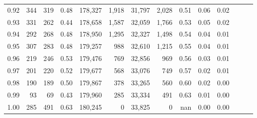 \begin{tabular}{rrrrrrrrrrrrrr}
0.92 &    344 &  319 &  0.48 &  178,327 &    1,918 &  31,797 &   2,028 &  0.51 &  0.06 &      0.02 \\
0.93 &    331 &  262 &  0.44 &  178,658 &    1,587 &  32,059 &   1,766 &  0.53 &  0.05 &      0.02 \\
0.94 &    292 &  268 &  0.48 &  178,950 &    1,295 &  32,327 &   1,498 &  0.54 &  0.04 &      0.01 \\
0.95 &    307 &  283 &  0.48 &  179,257 &      988 &  32,610 &   1,215 &  0.55 &  0.04 &      0.01 \\
0.96 &    219 &  246 &  0.53 &  179,476 &      769 &  32,856 &     969 &  0.56 &  0.03 &      0.01 \\
0.97 &    201 &  220 &  0.52 &  179,677 &      568 &  33,076 &     749 &  0.57 &  0.02 &      0.01 \\
0.98 &    190 &  189 &  0.50 &  179,867 &      378 &  33,265 &     560 &  0.60 &  0.02 &      0.00 \\
0.99 &     93 &   69 &  0.43 &  179,960 &      285 &  33,334 &     491 &  0.63 &  0.01 &      0.00 \\
1.00 &    285 &  491 &  0.63 &  180,245 &        0 &  33,825 &       0 &   nan &  0.00 &      0.00 \\
\bottomrule
\end{tabular}

